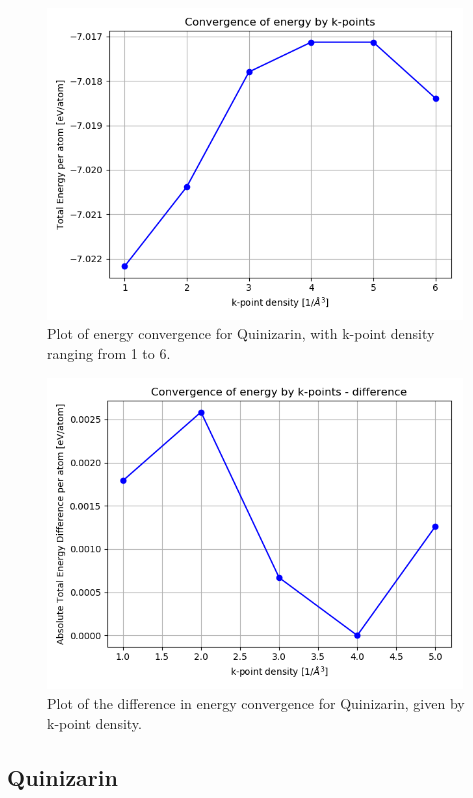 \documentclass{article}
\begin{document}
    \begin{figure}[H]
        \centering
        \includegraphics[width = 11cm]{../fig/convergence_kpoints.png}
        \caption{Plot of energy convergence for Quinizarin, with k-point density ranging from 1 to 6. }
        \label{fig:convergence_kpoints.png}
    \end{figure}

    \begin{figure}[H]
        \centering
        \includegraphics[width = 11cm]{../fig/convergence_kpoints_difference.png}
        \caption{Plot of the difference in energy convergence for Quinizarin, given by k-point density. }
        \label{fig:convergence_kpoints_difference.png}
    \end{figure}


  \subsection{Quinizarin}
\end{document}
